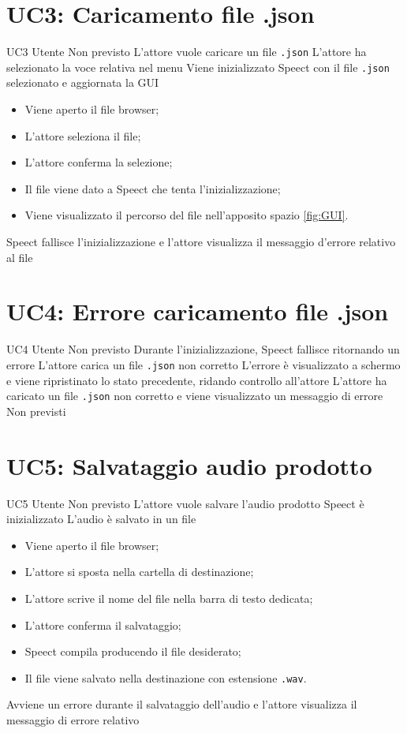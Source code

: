 \documentclass[../AnalisideiRequisiti.tex]{subfiles}
\begin{document}
	\section{UC3: Caricamento file .json}
	\UserCase
	{UC3}
	{Utente}
	{Non previsto}
	{L'attore vuole caricare un file \verb|.json|}
	{L'attore ha selezionato la voce relativa nel menu }
	{Viene inizializzato Speect con il file \verb|.json| selezionato e aggiornata la GUI}
	{
		\begin{itemize}
			\item{} Viene aperto il file browser;
			\item{} L'attore seleziona il file;
			\item{} L'attore conferma la selezione;
			\item{} Il file viene dato a Speect che tenta l'inizializzazione;
			\item{} Viene visualizzato il percorso del file nell'apposito spazio \ref{fig:GUI}.
		\end{itemize}
	}
	{Speect fallisce l'inizializzazione e l'attore visualizza il messaggio d'errore relativo al file }
	
	\section{UC4: Errore caricamento file .json}
	\UserCase
	{UC4}
	{Utente}
	{Non previsto}
	{Durante l'inizializzazione, Speect fallisce ritornando un errore}
	{L'attore carica un file \verb|.json| non corretto}
	{L'errore è visualizzato a schermo e viene ripristinato lo stato precedente, ridando controllo all'attore}
	{L'attore ha caricato un file \verb|.json| non corretto e viene visualizzato un messaggio di errore}
	{Non previsti}

\section{UC5: Salvataggio audio prodotto}
\UserCase
{UC5}
{Utente}
{Non previsto}
{L'attore vuole salvare l'audio prodotto}
{Speect è inizializzato }
{L'audio è salvato in un file}
{
		\begin{itemize}
		\item{} Viene aperto il file browser;
		\item{} L'attore si sposta nella cartella di destinazione;
		\item{} L'attore scrive il nome del file nella barra di testo dedicata;
		\item{} L'attore conferma il salvataggio;
		\item{} Speect compila producendo il file desiderato;
		\item{} Il file viene salvato nella destinazione con estensione \verb|.wav|.
		\end{itemize}
}
{Avviene un errore durante il salvataggio dell'audio e l'attore visualizza il messaggio di errore relativo }
		
\end{document}
